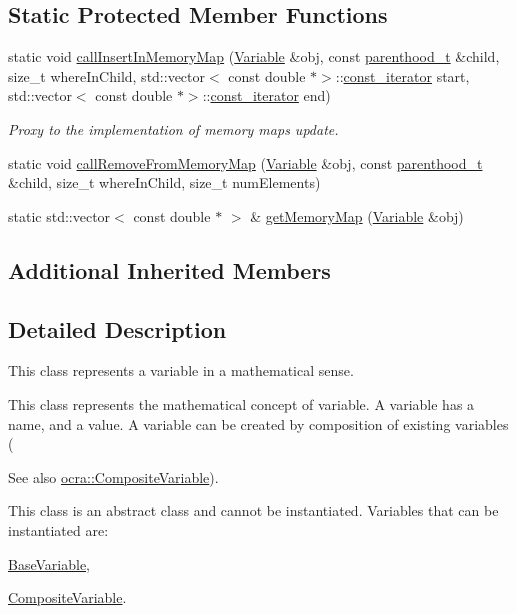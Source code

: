 \subsection*{Static Protected Member Functions}
{\bf }\par
\begin{DoxyCompactItemize}
\item 
static void \hyperlink{classocra_1_1Variable_a43d6c01f9fe017b4cfb78e4a18104bc8}{call\+Insert\+In\+Memory\+Map} (\hyperlink{classocra_1_1Variable}{Variable} \&obj, const \hyperlink{classocra_1_1Variable_a88444b2124cf5aab069f46734822f31f}{parenthood\+\_\+t} \&child, size\+\_\+t where\+In\+Child, std\+::vector$<$ const double $\ast$$>$\+::\hyperlink{classocra_1_1Component_a6271631f04d2911e4369d1288074eebb}{const\+\_\+iterator} start, std\+::vector$<$ const double $\ast$$>$\+::\hyperlink{classocra_1_1Component_a6271631f04d2911e4369d1288074eebb}{const\+\_\+iterator} end)
\begin{DoxyCompactList}\small\item\em Proxy to the implementation of memory maps update. \end{DoxyCompactList}\item 
static void \hyperlink{classocra_1_1Variable_a2433c62cad31e263aba58e16b6426971}{call\+Remove\+From\+Memory\+Map} (\hyperlink{classocra_1_1Variable}{Variable} \&obj, const \hyperlink{classocra_1_1Variable_a88444b2124cf5aab069f46734822f31f}{parenthood\+\_\+t} \&child, size\+\_\+t where\+In\+Child, size\+\_\+t num\+Elements)
\item 
static std\+::vector$<$ const double $\ast$ $>$ \& \hyperlink{classocra_1_1Variable_a7d1596e0377ebc5a74254027a425d334}{get\+Memory\+Map} (\hyperlink{classocra_1_1Variable}{Variable} \&obj)
\end{DoxyCompactItemize}

\subsection*{Additional Inherited Members}


\subsection{Detailed Description}
This class represents a variable in a mathematical sense. 

This class represents the mathematical concept of variable. A variable has a name, and a value. A variable can be created by composition of existing variables (\begin{DoxySeeAlso}{See also}
\hyperlink{classocra_1_1CompositeVariable}{ocra\+::\+Composite\+Variable}).
\end{DoxySeeAlso}
This class is an abstract class and cannot be instantiated. Variables that can be instantiated are\+:
\begin{DoxyItemize}
\item \hyperlink{classocra_1_1BaseVariable}{Base\+Variable},
\item \hyperlink{classocra_1_1CompositeVariable}{Composite\+Variable}.
\end{DoxyItemize}

